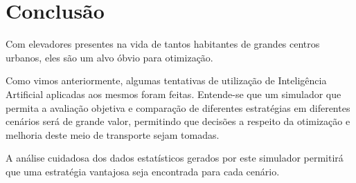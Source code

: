 \chapter{\label{chap:conclusion}Conclusão}

Com elevadores presentes na vida de tantos habitantes de grandes centros
urbanos, eles são um alvo óbvio para otimização.

Como vimos anteriormente, algumas tentativas de utilização de Inteligência
Artificial aplicadas aos mesmos foram feitas. Entende-se que um simulador que
permita a avaliação objetiva e comparação de diferentes estratégias em
diferentes cenários será de grande valor, permitindo que decisões a respeito da
otimização e melhoria deste meio de transporte sejam tomadas.

A análise cuidadosa dos dados estatísticos gerados por este simulador permitirá
que uma estratégia vantajosa seja encontrada para cada cenário.